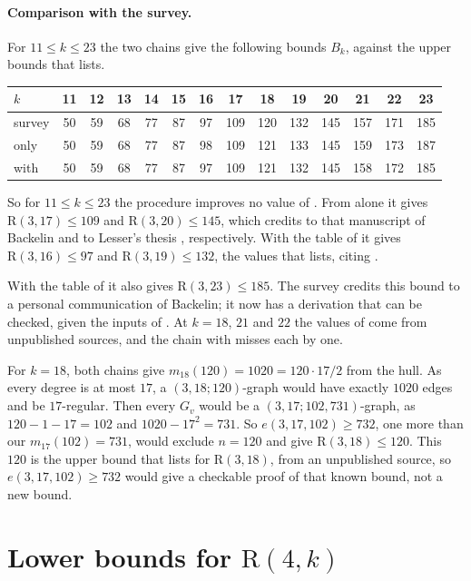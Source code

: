 \documentclass[11pt]{article}
\theoremstyle{spacedplain}
\theoremstyle{spaceddef}
\theoremstyle{spacedremark}
\newcommand{\R}{\mathrm{R}}
\begin{document}
\paragraph{Comparison with the survey.}
For $11\le k\le 23$ the two chains give the following bounds $B_k$, against the upper bounds that \cite{Rad26} lists.
\begin{center}\small\setlength{\tabcolsep}{4pt}
\begin{tabular}{l*{13}{c}}
\toprule
$k$ & 11 & 12 & 13 & 14 & 15 & 16 & 17 & 18 & 19 & 20 & 21 & 22 & 23\\
\midrule
survey \cite{Rad26} & 50 & 59 & 68 & 77 & 87 & 97 & 109 & 120 & 132 & 145 & 157 & 171 & 185\\
\cite{GR13} only & 50 & 59 & 68 & 77 & 87 & 98 & 109 & 121 & 133 & 145 & 159 & 173 & 187\\
with \cite{Back3} & 50 & 59 & 68 & 77 & 87 & 97 & 109 & 121 & 132 & 145 & 158 & 172 & 185\\
\bottomrule
\end{tabular}
\end{center}
So for $11\le k\le 23$ the procedure improves no value of \cite{Rad26}.
From \cite{GR13} alone it gives $\R(3,17)\le 109$ and $\R(3,20)\le 145$, which \cite{Rad26} credits to that manuscript of Backelin and to Lesser's thesis \cite{Les}, respectively.
With the table of \cite{Back3} it gives $\R(3,16)\le 97$ and $\R(3,19)\le 132$, the values that \cite{Rad26} lists, citing \cite{Back3}.

With the table of \cite{Back3} it also gives $\R(3,23)\le 185$.
The survey \cite{Rad26} credits this bound to a personal communication of Backelin; it now has a derivation that can be checked, given the inputs of \cite{Back3}.
At $k=18$, $21$ and $22$ the values of \cite{Rad26} come from unpublished sources, and the chain with \cite{Back3} misses each by one.

For $k=18$, both chains give $m_{18}(120)=1020=120\cdot 17/2$ from the hull.
As every degree is at most $17$, a $(3,18;120)$-graph would have exactly $1020$ edges and be $17$-regular.
Then every $G_v$ would be a $(3,17;102,731)$-graph, as $120-1-17=102$ and $1020-17^2=731$.
So $e(3,17,102)\ge 732$, one more than our $m_{17}(102)=731$, would exclude $n=120$ and give $\R(3,18)\le 120$.
This $120$ is the upper bound that \cite{Rad26} lists for $\R(3,18)$, from an unpublished source, so $e(3,17,102)\ge 732$ would give a checkable proof of that known bound, not a new bound.

\section{Lower bounds for \texorpdfstring{$\R(4,k)$}{R(4,k)}}\label{sec:r4k}
\end{document}
